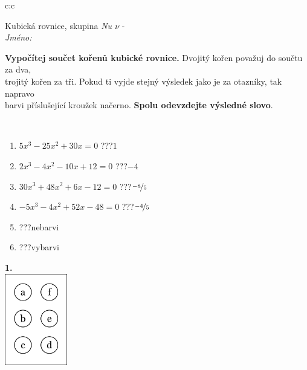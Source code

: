 \documentclass[10pt]{report}
\begin{document}
\begin{tabular}{c:c}
\begin{minipage}[c][104.5mm][t]{0.5\linewidth}
\begin{center}
\vspace{7mm}
{\huge Kubická rovnice, skupina \textit{Nu $\nu$} -}\\[5mm]
\textit{Jméno:}\phantom{xxxxxxxxxxxxxxxxxxxxxxxxxxxxxxxxxxxxxxxxxxxxxxxxxxxxxxxxxxxxxxxxx}\\[5mm]
\begin{minipage}{0.95\linewidth}
\begin{center}
\textbf{Vypočítej součet kořenů kubické rovnice.} Dvojitý kořen považuj do součtu za dva,\\trojitý kořen za tři. Pokud ti vyjde stejný výsledek jako je za otazníky, tak napravo\\barvi příslušející kroužek načerno. \textbf{Spolu odevzdejte výsledné slovo}.
\end{center}
\end{minipage}
\\[1mm]
\begin{minipage}{0.79\linewidth}
\begin{center}
\begin{varwidth}{\linewidth}
\begin{enumerate}
\Large
\item $5x^3-25x^2+30x=0$\quad \dotfill\; ???\;\dotfill \quad $1$
\item $2x^3-4x^2-10x+12=0$\quad \dotfill\; ???\;\dotfill \quad $-4$
\item $30x^3+48x^2+6x-12=0$\quad \dotfill\; ???\;\dotfill \quad $\nicefrac{-8}{5}$
\item $-5x^3-4x^2+52x-48=0$\quad \dotfill\; ???\;\dotfill \quad $\nicefrac{-4}{5}$
\item \quad \dotfill\; ???\;\dotfill \quad nebarvi
\item \quad \dotfill\; ???\;\dotfill \quad vybarvi
\end{enumerate}
\end{varwidth}
\end{center}
\end{minipage}
\begin{minipage}{0.20\linewidth}
\begin{center}
{\Huge\bfseries 1.} \\[2mm]
\includegraphics[height=40mm]{../images/braille.png}

\end{center}
\end{minipage}
\end{center}
\end{minipage}
\end{tabular}
\end{document}
